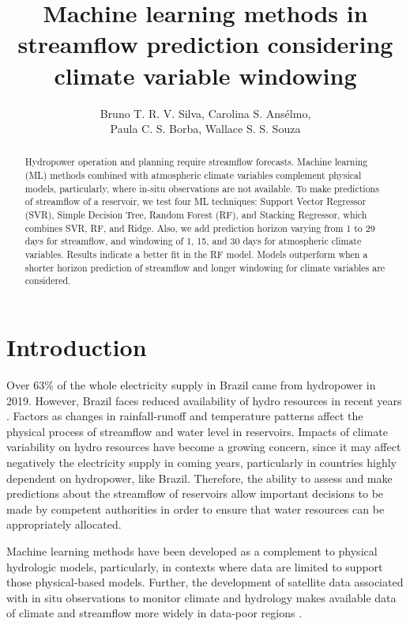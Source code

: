 \documentclass[12pt]{article}
\title{Machine learning methods in streamflow prediction  considering climate variable windowing}
\author{%
    Bruno T. R. V. Silva\inst{1}, %
    Carolina S. Ansélmo\inst{1}, \\%
    Paula C. S. Borba\inst{1}, %
    Wallace S. S. Souza\inst{1}%
}
\begin{document}
\maketitle

\begin{abstract}
Hydropower operation and planning require streamflow forecasts. Machine learning (ML) methods combined with atmospheric climate variables complement physical models, particularly, where in-situ observations are not available. To make predictions of streamflow of a reservoir, we test four ML techniques: Support Vector Regressor (SVR), Simple Decision Tree, Random Forest (RF), and Stacking Regressor, which combines SVR, RF, and Ridge. Also, we add prediction horizon varying from 1 to 29 days for streamflow, and windowing of 1, 15, and 30 days for atmospheric climate variables. Results indicate a better fit in the RF model. Models outperform when a shorter horizon prediction of streamflow and longer windowing for climate variables are considered.

\end{abstract}


\section{Introduction}
\label{sec:Introduction}

Over 63\% of the whole electricity supply in Brazil came from hydropower in 2019. However, Brazil faces reduced availability of hydro resources in recent years \cite{onsseca}. Factors as changes in rainfall-runoff and temperature patterns affect the physical process of streamflow and water level in reservoirs. Impacts of climate variability on hydro resources have become a growing concern, since it may affect negatively the electricity supply in coming years, particularly in countries highly dependent on hydropower, like Brazil. Therefore, the ability to assess and make predictions about the streamflow of reservoirs allow important decisions to be made by competent authorities in order to ensure that water resources can be appropriately allocated.

Machine learning methods have been developed as a complement to physical hydrologic models, particularly, in contexts where data are limited to support those physical-based models. Further, the development of satellite data associated with in situ observations to monitor climate and hydrology makes available data of climate and streamflow more widely in data-poor regions \cite{julie}.
\end{document}
